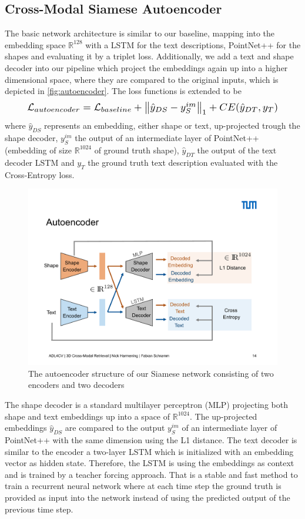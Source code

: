 \documentclass[10pt,twocolumn,letterpaper]{article}
\begin{document}
\subsection{Cross-Modal Siamese Autoencoder}
The basic network architecture is similar to our baseline, mapping into the embedding space $\mathbb{R}^{128}$ with a LSTM for the text descriptions, PointNet++ for the shapes and evaluating it by a triplet loss. Additionally, we add a text and shape decoder into our pipeline which project the embeddings again up into a higher dimensional space, where they are compared to the original inputs, which is depicted in \autoref{fig:autoencoder}. The loss functions is extended to be
\begin{equation}
\label{eqn:4}
\resizebox{.9 \linewidth}{!}
{$\mathcal{L}_{autoencoder} = \mathcal{L}_{baseline}+ \left\lVert \hat{y}_{DS}-y_S^{im}\right\rVert_1+CE(\hat{y}_{DT}, {y}_T)$}
\end{equation}
where $\hat{y}_{DS}$ represents an embedding, either shape or text, up-projected trough the shape decoder, $y_S^{im}$ the output of an intermediate layer of PointNet++ (embedding of size $\mathbb{R}^{1024}$ of ground truth shape), $\hat{y}_{DT}$ the output of the text decoder LSTM and $y_T$ the ground truth text description evaluated with the Cross-Entropy loss.
\begin{figure}[t]%
	\centering
	\includegraphics[width=0.8\linewidth]{fig4.pdf}
	\caption[]{The autoencoder structure of our Siamese network consisting of two encoders and two decoders}
	\label{fig:autoencoder}
\end{figure}
The shape decoder is a standard multilayer perceptron (MLP) projecting both shape and text embeddings up into a space of $\mathbb{R}^{1024}$. The up-projected embeddings $\hat{y}_{DS}$ are compared to the output $y_S^{im}$ of an intermediate layer of PointNet++ with the same dimension using the L1 distance. The text decoder is similar to the encoder a two-layer LSTM which is initialized with an embedding vector as hidden state. Therefore, the LSTM is using the embeddings as context and is trained by a teacher forcing approach. That is a stable and fast method to train a recurrent neural network where at each time step the ground truth is provided as input into the network instead of using the predicted output of the previous time step.
\end{document}
